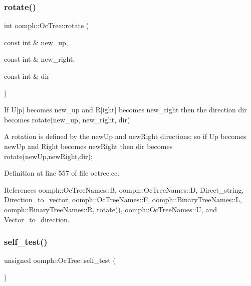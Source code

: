 \mbox{\label{classoomph_1_1OcTree_ab65a00f8f47eb8b6da56ffa9d6ba8f36}} 
\subsubsection{\texorpdfstring{rotate()}{rotate()}\hspace{0.1cm}{\footnotesize\ttfamily [2/2]}}
{\footnotesize\ttfamily int oomph\+::\+Oc\+Tree\+::rotate (\begin{DoxyParamCaption}\item[{const int \&}]{new\+\_\+up,  }\item[{const int \&}]{new\+\_\+right,  }\item[{const int \&}]{dir }\end{DoxyParamCaption})\hspace{0.3cm}{\ttfamily [static]}}



If U\mbox{[}p\mbox{]} becomes new\+\_\+up and R\mbox{[}ight\mbox{]} becomes new\+\_\+right then the direction {\ttfamily dir} becomes {\ttfamily rotate(new\+\_\+up, new\+\_\+right, dir)} 

A rotation is defined by the new\+Up and new\+Right directions; so if Up becomes new\+Up and Right becomes new\+Right then dir becomes rotate(new\+Up,new\+Right,dir); 

Definition at line 557 of file octree.\+cc.



References oomph\+::\+Oc\+Tree\+Names\+::B, oomph\+::\+Oc\+Tree\+Names\+::D, Direct\+\_\+string, Direction\+\_\+to\+\_\+vector, oomph\+::\+Oc\+Tree\+Names\+::F, oomph\+::\+Binary\+Tree\+Names\+::L, oomph\+::\+Binary\+Tree\+Names\+::R, rotate(), oomph\+::\+Oc\+Tree\+Names\+::U, and Vector\+\_\+to\+\_\+direction.

\mbox{\label{classoomph_1_1OcTree_a68218b6e02594bef23cb141af8a19ffb}} 
\subsubsection{\texorpdfstring{self\+\_\+test()}{self\_test()}}
{\footnotesize\ttfamily unsigned oomph\+::\+Oc\+Tree\+::self\+\_\+test (\begin{DoxyParamCaption}{ }\end{DoxyParamCaption})}



